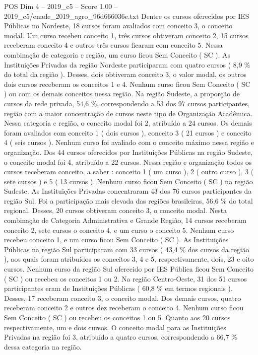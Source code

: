 \begin{textsample}{POS Dim 4 – 2019\_c5 – Score 1.00 – 2019\_c5/enade\_2019\_agro\_96d666036e.txt}
Dentre os cursos oferecidos por IES Públicas no Nordeste, 18 cursos foram avaliados com conceito 3, o conceito modal.
Um curso recebeu conceito 1, três cursos obtiveram conceito 2, 15 cursos receberam conceito 4 e outros três cursos ficaram com conceito 5.
Nessa combinação de categoria e região, um curso ficou Sem Conceito ( SC ).
As Instituições Privadas da região Nordeste participaram com quatro cursos ( 8,9 \% do total da região ).
Desses, dois obtiveram conceito 3, o valor modal, os outros dois cursos receberam os conceitos 1 e 4.
Nenhum curso ficou Sem Conceito ( SC ) ou com os demais conceitos nessa região.
Na região Sudeste, a proporção de cursos da rede privada, 54,6 \%, correspondendo a 53 dos 97 cursos participantes, região com a maior concentração de cursos neste tipo de Organização Acadêmica.
Nessa categoria e região, o conceito modal foi 2, atribuído a 24 cursos.
Os demais foram avaliados com conceito 1 ( dois cursos ), conceito 3 ( 21 cursos ) e conceito 4 ( seis cursos ).
Nenhum curso foi avaliado com o conceito máximo nessa região e organização.
Dos 44 cursos oferecidos por Instituições Públicas na região Sudeste, o conceito modal foi 4, atribuído a 22 cursos.
Nessa região e organização todos os cursos receberam conceito, a saber : conceito 1 ( um curso ), 2 ( outro curso ), 3 ( sete cursos ) e 5 ( 13 cursos ).
Nenhum curso ficou Sem Conceito ( SC ) na região Sudeste.
As Instituições Privadas concentraram 43 dos 76 cursos participantes da região Sul.
Foi a participação mais elevada das regiões brasileiras, 56,6 \% do total regional.
Desses, 20 cursos obtiveram conceito 3, o conceito modal.
Nesta combinação de Categoria Administrativa e Grande Região, 14 cursos receberam conceito 2, sete cursos o conceito 4, e um curso o conceito 5.
Nenhum curso recebeu conceito 1, e um curso ficou Sem Conceito ( SC ).
As Instituições Públicas na região Sul participaram com 33 cursos ( 43,4 \% dos cursos da região ), aos quais foram atribuídos os conceitos 3, 4 e 5, respectivamente, dois, 23 e oito cursos.
Nenhum curso da região Sul oferecido por IES Pública ficou Sem Conceito ( SC ) ou recebeu os conceitos 1 ou 2.
Na região Centro-Oeste, 31 dos 51 cursos participantes eram de Instituições Públicas ( 60,8 \% em termos regionais ).
Desses, 17 receberam conceito 3, o conceito modal.
Dos demais cursos, quatro receberam conceito 2 e outros dez receberam o conceito 4.
Nenhum curso ficou Sem Conceito ( SC ) ou recebeu os conceitos 1 ou 5.
Quanto aos 20 cursos respectivamente, um e dois cursos.
O conceito modal para as Instituições Privadas na região foi 3, atribuído a quatro cursos, correspondendo a 66,7 \% dessa categoria na região.

\end{textsample}
